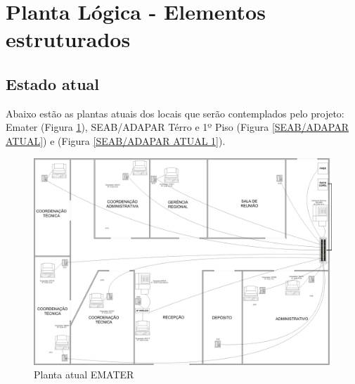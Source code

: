\documentclass[	DIV=calc,%
							paper=a4,%
							fontsize=12pt,%
							onecolumn]{scrartcl}	 					%
\begin{document}
\section{Planta Lógica - Elementos estruturados}

\subsection{Estado atual}
Abaixo estão as plantas atuais dos locais que serão contemplados pelo projeto: Emater (Figura \ref{EMATER ATUAL}), SEAB/ADAPAR Térro e 1º Piso (Figura \ref{SEAB/ADAPAR ATUAL}) e (Figura \ref{SEAB/ADAPAR ATUAL 1}).

\begin{figure}[H]
	\centering
	\includegraphics[height=\textwidth,width=25cm,angle=-90,keepaspectratio]{plantaemater}
	\caption{Planta atual EMATER}
	\label{EMATER ATUAL}	
\end{figure}
\end{document}
